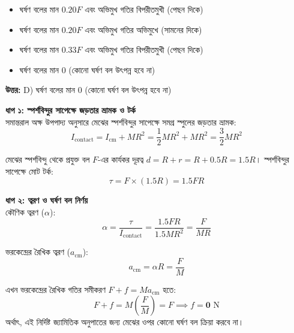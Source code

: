 \documentclass[12pt, a4paper]{article}
\begin{document}
{{%
\begin{itemize}[label={}, leftmargin=1cm, itemsep=0.5em]
    \item[\textbf{A)}] ঘর্ষণ বলের মান $0.20 F$ এবং অভিমুখ গতির বিপরীতমুখী (পেছন দিকে)
    \item[\textbf{B)}] ঘর্ষণ বলের মান $0.20 F$ এবং অভিমুখ গতির অভিমুখে (সামনের দিকে)
    \item[\textbf{C)}] ঘর্ষণ বলের মান $0.33 F$ এবং অভিমুখ গতির বিপরীতমুখী (পেছন দিকে)
    \item[\textbf{D)}] ঘর্ষণ বলের মান $0$ (কোনো ঘর্ষণ বল উৎপন্ন হবে না)
\end{itemize}

\vspace{0.5em}
\begin{tcolorbox}[answerbox]
    \textbf{\color{success} উত্তর:} D) ঘর্ষণ বলের মান $0$ (কোনো ঘর্ষণ বল উৎপন্ন হবে না)
\end{tcolorbox}
\vspace{1em}

\begin{tcolorbox}[solutionbox={সমাধান (Solution)}]
    \noindent
    \textbf{ধাপ ১: স্পর্শবিন্দুর সাপেক্ষে জড়তার ভ্রামক ও টর্ক} \\
    সমান্তরাল অক্ষ উপপাদ্য অনুসারে মেঝের স্পর্শবিন্দুর সাপেক্ষে সমগ্র স্পুলের জড়তার ভ্রামক:
    \[ I_{\text{contact}} = I_{\text{cm}} + M R^2 = \frac{1}{2} M R^2 + M R^2 = \frac{3}{2} M R^2 \]
    
    মেঝের স্পর্শবিন্দু থেকে প্রযুক্ত বল $F$-এর কার্যকর দূরত্ব $d = R + r = R + 0.5R = 1.5R$। স্পর্শবিন্দুর সাপেক্ষে মোট টর্ক:
    \[ \tau = F \times (1.5R) = 1.5 F R \]
    
    \vspace{0.5em}
    \noindent\textbf{ধাপ ২: ত্বরণ ও ঘর্ষণ বল নির্ণয়} \\
    কৌণিক ত্বরণ ($\alpha$):
    \[ \alpha = \frac{\tau}{I_{\text{contact}}} = \frac{1.5 F R}{1.5 M R^2} = \frac{F}{M R} \]
    
    ভরকেন্দ্রের রৈখিক ত্বরণ ($a_{\text{cm}}$):
    \[ a_{\text{cm}} = \alpha R = \frac{F}{M} \]
    
    এখন ভরকেন্দ্রের রৈখিক গতির সমীকরণ $F + f = M a_{\text{cm}}$ হতে:
    \[ F + f = M \left(\frac{F}{M}\right) = F \implies f = \mathbf{0}\text{ N} \]
    অর্থাৎ, এই নির্দিষ্ট জ্যামিতিক অনুপাতের জন্য মেঝের ওপর কোনো ঘর্ষণ বল ক্রিয়া করবে না।
\end{tcolorbox}

}}
\end{document}
